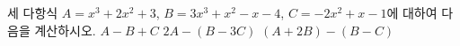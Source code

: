 세 다항식 $A=x^3+2x^2+3$, $B=3x^3+x^2-x-4$, $C=-2x^2+x-1$에 대하여 다음을 계산하시오.
 $A-B+C$
 $2A-(B-3C)$
 $(A+2B)-(B-C)$
